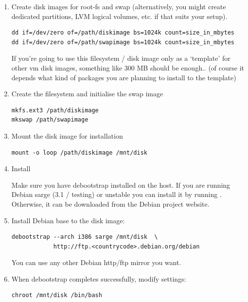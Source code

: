 \documentclass[11pt,twoside,final,openright]{report}
\begin{document}
{\begin{enumerate}
\item Create disk images for root-fs and swap (alternatively, you
      might create dedicated partitions, LVM logical volumes, etc. if
      that suits your setup).
\begin{small}\begin{verbatim}  
dd if=/dev/zero of=/path/diskimage bs=1024k count=size_in_mbytes
dd if=/dev/zero of=/path/swapimage bs=1024k count=size_in_mbytes
\end{verbatim}\end{small}
      If you're going to use this filesystem / disk image only as a
      `template' for other vm disk images, something like 300 MB should
      be enough.. (of course it depends what kind of packages you are
      planning to install to the template)

\item Create the filesystem and initialise the swap image
\begin{small}\begin{verbatim}
mkfs.ext3 /path/diskimage
mkswap /path/swapimage
\end{verbatim}\end{small}

\item Mount the disk image for installation
\begin{small}\begin{verbatim}
mount -o loop /path/diskimage /mnt/disk
\end{verbatim}\end{small}

\item Install 

Make sure you have debootstrap installed on the host.  If you are
running Debian sarge (3.1 / testing) or unstable you can install it by
running .  Otherwise, it can be
downloaded from the Debian project website.

\item Install Debian base to the disk image:
\begin{small}\begin{verbatim}
debootstrap --arch i386 sarge /mnt/disk  \
            http://ftp.<countrycode>.debian.org/debian
\end{verbatim}\end{small}

You can use any other Debian http/ftp mirror you want.

\item When debootstrap completes successfully, modify settings:
\begin{small}\begin{verbatim}
chroot /mnt/disk /bin/bash
\end{verbatim}\end{small}


\end{enumerate}}
\end{document}
